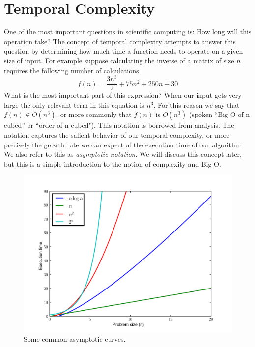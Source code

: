 

\section*{Temporal Complexity}
One of the most important questions in scientific computing is: 
How long will this operation take?  
The concept of temporal complexity attempts to answer this question by determining 
how much time a function needs to operate on a given size of input.  
For example suppose calculating the inverse of a matrix of size $n$ requires the following number of calculations.
\begin{equation*}
f(n) = \frac{3n^3}{2} + 75n^2 + 250n + 30
\end{equation*}
What is the most important part of this expression? 
When our input gets very large the only relevant term in this equation is $n^3$. 
For this reason we say that $f(n) \in O(n^3)$, or more commonly that $f(n)$ is $O(n^3)$ 
(spoken ``Big O of n cubed'' or ``order of n cubed"). 
This notation is borrowed from analysis. The notation captures the salient behavior of our temporal complexity, 
or more precisely the growth rate we can expect of the execution time of our algorithm. 
We also refer to this as \emph{asymptotic notation}. 
We will discuss this concept later, but this is a simple introduction to the notion of complexity and Big O.
\begin{figure}[h]
\centering
\includegraphics[width=\textwidth]{complexitycurves.pdf}
\caption{Some common asymptotic curves.}
\end{figure}


